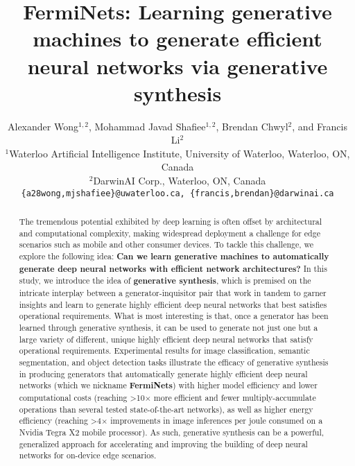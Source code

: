 \documentclass{article}
\title{FermiNets: Learning generative machines to generate efficient neural networks via generative synthesis}
\author{
  Alexander Wong$^{1,2}$, Mohammad Javad Shafiee$^{1,2}$, Brendan Chwyl$^2$, and Francis Li$^2$\\
  $^{1}$Waterloo Artificial Intelligence Institute, University of Waterloo, Waterloo, ON, Canada\\
  $^{2}$DarwinAI Corp., Waterloo, ON, Canada\\
  \texttt{\{a28wong,mjshafiee\}@uwaterloo.ca, \{francis,brendan\}@darwinai.ca}
}
\begin{document}
\maketitle

\begin{abstract}
The tremendous potential exhibited by deep learning is often offset by architectural and computational complexity, making widespread deployment a challenge for edge scenarios such as mobile and other consumer devices.  To tackle this challenge, we explore the following idea: \textbf{Can we learn generative machines to automatically generate deep neural networks with efficient network architectures?}  In this study, we introduce the idea of \textbf{generative synthesis}, which is premised on the intricate interplay between a generator-inquisitor pair that work in tandem to garner insights and learn to generate highly efficient deep neural networks that best satisfies operational requirements.  What is most interesting is that, once a generator has been learned through generative synthesis, it can be used to generate not just one but a large variety of different, unique highly efficient deep neural networks that satisfy operational requirements.  Experimental results for image classification, semantic segmentation, and object detection tasks illustrate the efficacy of generative synthesis in producing generators that automatically generate highly efficient deep neural networks (which we nickname \textbf{FermiNets}) with higher model efficiency and lower computational costs (reaching >10$\times$ more efficient and fewer multiply-accumulate operations than several tested state-of-the-art networks), as well as higher energy efficiency (reaching >4$\times$ improvements in image inferences per joule consumed on a Nvidia Tegra X2 mobile processor).  As such, generative synthesis can be a powerful, generalized approach for accelerating and improving the building of deep neural networks for on-device edge scenarios.
\end{abstract}
\end{document}
